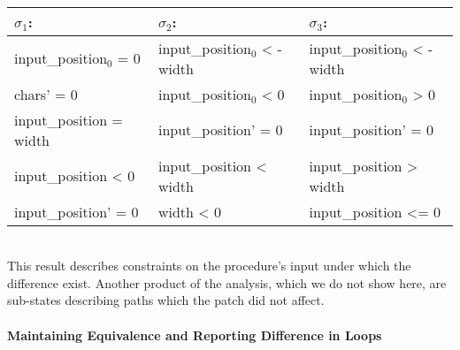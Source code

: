 \\
\begin{tabular}{l|l|l}
$\sigma_1$:                 & $\sigma_2$:                   & $\sigma_3$: 
\\ \hline
input\_position${_0}$ = 0     & input\_position${_0}$  < -width & input\_position${_0}$  < -width
\\
chars' = 0                & input\_position${_0}$  < 0      & input\_position${_0}$  > 0
\\
input\_position = width   & input\_position' = 0        & input\_position' = 0
\\
input\_position < 0       & input\_position < width     & input\_position > width
\\
input\_position' = 0      & width < 0                   & input\_position <= 0
\\ \hline
\end{tabular}
\\
This result describes constraints on the procedure's input under which the difference exist. Another product of the analysis, which we do not show here, are sub-states describing paths which the patch did not affect.

\paragraph{Maintaining Equivalence and Reporting Difference in Loops}



